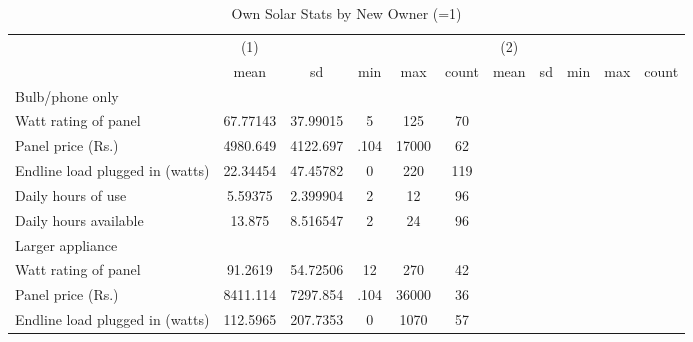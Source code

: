 \begin{table}[htbp]\centering
\def\sym#1{\ifmmode^{#1}\else\(^{#1}\)\fi}
\caption{Own Solar Stats by New Owner (=1)\label {tab1}}
\begin{tabular}{l*{2}{ccccc}}
\toprule
                    &\multicolumn{1}{c}{(1)}&            &            &            &            &\multicolumn{1}{c}{(2)}&            &            &            &            \\
                    &        mean&          sd&         min&         max&       count&        mean&          sd&         min&         max&       count\\
\midrule
Bulb/phone only     &            &            &            &            &            &            &            &            &            &            \\
Watt rating of panel&    67.77143&    37.99015&           5&         125&          70&            &            &            &            &            \\
Panel price (Rs.)   &    4980.649&    4122.697&        .104&       17000&          62&            &            &            &            &            \\
Endline load plugged in (watts)&    22.34454&    47.45782&           0&         220&         119&            &            &            &            &            \\
Daily hours of use  &     5.59375&    2.399904&           2&          12&          96&            &            &            &            &            \\
Daily hours available&      13.875&    8.516547&           2&          24&          96&            &            &            &            &            \\
\midrule
Larger appliance    &            &            &            &            &            &            &            &            &            &            \\
Watt rating of panel&     91.2619&    54.72506&          12&         270&          42&            &            &            &            &            \\
Panel price (Rs.)   &    8411.114&    7297.854&        .104&       36000&          36&            &            &            &            &            \\
Endline load plugged in (watts)&    112.5965&    207.7353&           0&        1070&          57&            &            &            &            &            \\

\end{tabular}
\end{table}
